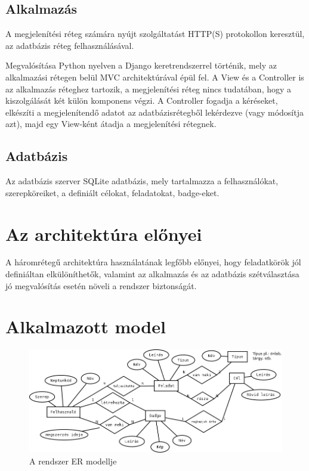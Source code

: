 \documentclass[a4paper,10pt,titlepage]{article}
\begin{document}
\subsection{Alkalmazás}
A megjelenítési réteg számára nyújt szolgáltatást HTTP(S) protokollon keresztül, az adatbázis réteg felhasználásával.

Megvalósítása Python nyelven a Django keretrendszerrel történik, mely az alkalmazási rétegen belül MVC architektúrával épül fel. A View és a Controller is az alkalmazás réteghez tartozik, a megjelenítési réteg nincs tudatában, hogy a kiszolgálását két külön komponens végzi. A Controller fogadja a kéréseket, elkészíti a megjelenítendő adatot az adatbázisrétegből lekérdezve (vagy módosítja azt), majd egy View-ként átadja a megjelenítési rétegnek.

\subsection{Adatbázis}
Az adatbázis szerver SQLite adatbázis, mely tartalmazza a felhasználókat, szerepköreiket, a definiált célokat, feladatokat, badge-eket.

\section{Az architektúra előnyei}
A háromrétegű architektúra használatának legfőbb előnyei, hogy feladatkörök jól definiáltan elkülöníthetők, valamint az alkalmazás és az adatbázis szétválasztása jó megvalósítás esetén növeli a rendszer biztonságát.

\section{Alkalmazott model}

\begin{figure}[ht!]
\centering
\includegraphics[width=1.00\textwidth]{figures/modell.png}
\caption{A rendszer ER modellje \label{fig:modell}}
\end{figure}
\end{document}
